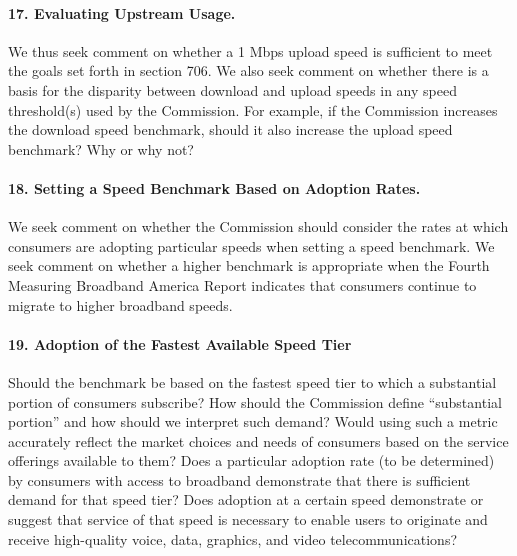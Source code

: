 \paragraph{17. Evaluating Upstream Usage.} We thus seek comment on whether a 1 Mbps 
upload speed is sufficient to meet the goals set forth in section 706. We also seek 
comment on whether there is a basis for the disparity between download and upload 
speeds in any speed threshold(s) used by the Commission. For example, if the Commission 
increases the download speed benchmark, should it also increase the upload speed benchmark?
Why or why not?

\paragraph{18. Setting a Speed Benchmark Based on Adoption Rates.} We seek comment on 
whether the Commission should consider the rates at which consumers are adopting 
particular speeds when setting a speed benchmark. We seek comment on whether a higher 
benchmark is appropriate when the Fourth Measuring Broadband America Report indicates 
that consumers continue to migrate to higher broadband speeds.

\paragraph{19. Adoption of the Fastest Available Speed Tier} Should the benchmark be based 
on the fastest speed tier to which a substantial portion of
consumers subscribe? How should the Commission define ``substantial portion'' and how 
should we interpret such demand? Would using such a metric accurately reflect the market 
choices and needs of consumers based on the service offerings available to them? Does a 
particular adoption rate (to be determined) by consumers with access to broadband 
demonstrate that there is sufficient demand for that speed tier? Does adoption at a 
certain speed demonstrate or suggest that service of that speed is necessary to 
enable users to originate and receive high-quality voice, data, graphics, and video 
telecommunications?

